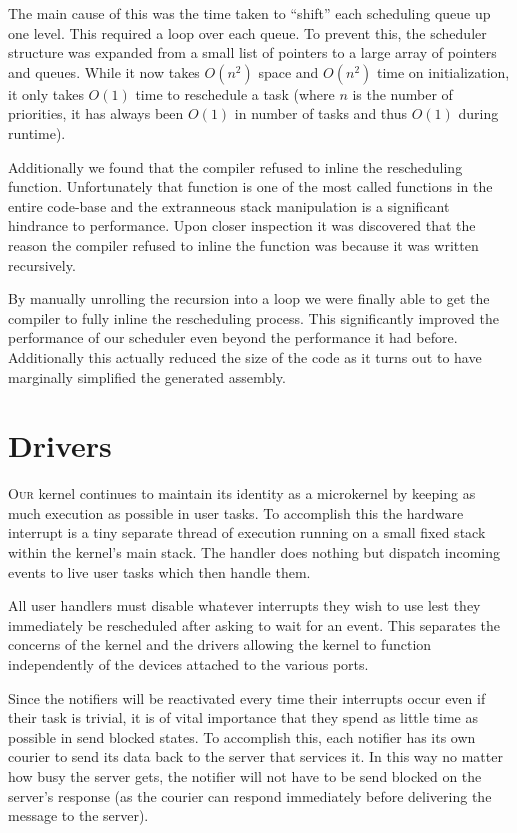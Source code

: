 \documentclass{amsart}
\begin{document}
The main cause of this was the time taken to ``shift'' each scheduling queue up
one level. This required a loop over each queue. To prevent this, the scheduler
structure was expanded from a small list of pointers to a large array of
pointers and queues. While it now takes $O(n^2)$ space and $O(n^2)$ time on
initialization, it only takes $O(1)$ time to reschedule a task (where $n$ is the
number of priorities, it has always been $O(1)$ in number of tasks and thus
$O(1)$ during runtime).

Additionally we found that the compiler refused to inline the rescheduling
function. Unfortunately that function is one of the most called functions in the
entire code-base and the extranneous stack manipulation is a significant
hindrance to performance. Upon closer inspection it was discovered that the
reason the compiler refused to inline the function was because it was written
recursively.

By manually unrolling the recursion into a loop we were finally able to get the
compiler to fully inline the rescheduling process. This significantly improved
the performance of our scheduler even beyond the performance it had before.
Additionally this actually reduced the size of the code as it turns out to have
marginally simplified the generated assembly.

\section*{Drivers}

\textsc{Our} kernel continues to maintain its identity as a microkernel by keeping as
much execution as possible in user tasks. To accomplish this the hardware
interrupt is a tiny separate thread of execution running on a small fixed stack
within the kernel's main stack. The handler does nothing but dispatch incoming
events to live user tasks which then handle them.

All user handlers must disable whatever interrupts they wish to use lest they
immediately be rescheduled after asking to wait for an event. This separates the
concerns of the kernel and the drivers allowing the kernel to function
independently of the devices attached to the various ports.

Since the notifiers will be reactivated every time their interrupts occur even if
their task is trivial, it is of vital importance that they spend as little time
as possible in send blocked states. To accomplish this, each notifier has its
own courier to send its data back to the server that services it. In this way no
matter how busy the server gets, the notifier will not have to be send blocked
on the server's response (as the courier can respond immediately before
delivering the message to the server).
\end{document}
